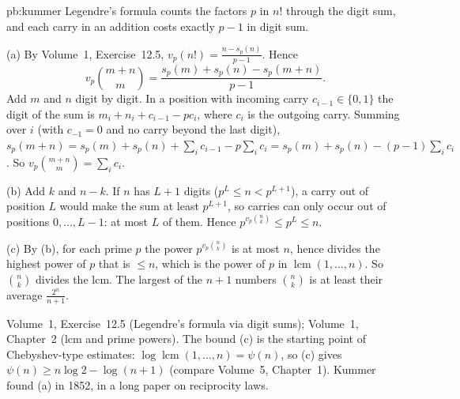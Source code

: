 \begin{solution}{pb:kummer}
\idea Legendre's formula counts the factors $p$ in $n!$ through the digit sum, and each carry in an addition costs exactly $p-1$
in digit sum.

\writeup (a) By Volume~1, Exercise~12.5, $v_p(n!)=\frac{n-s_p(n)}{p-1}$. Hence
\[
v_p\binom{m+n}m=\frac{s_p(m)+s_p(n)-s_p(m+n)}{p-1}.
\]
Add $m$ and $n$ digit by digit. In a position with incoming carry $c_{i-1}\in\{0,1\}$ the digit of the sum is
$m_i+n_i+c_{i-1}-pc_i$, where $c_i$ is the outgoing carry. Summing over $i$ (with $c_{-1}=0$ and no carry beyond the last digit),
$s_p(m+n)=s_p(m)+s_p(n)+\sum_ic_{i-1}-p\sum_ic_i=s_p(m)+s_p(n)-(p-1)\sum_ic_i$. So $v_p\binom{m+n}m=\sum_ic_i$.

(b) Add $k$ and $n-k$. If $n$ has $L+1$ digits ($p^L\le n<p^{L+1}$), a carry out of position $L$ would make the sum at least
$p^{L+1}$, so carries can only occur out of positions $0,\dots,L-1$: at most $L$ of them. Hence $p^{v_p\binom nk}\le p^L\le n$.

(c) By (b), for each prime $p$ the power $p^{v_p\binom nk}$ is at most $n$, hence divides the highest power of $p$ that is $\le n$,
which is the power of $p$ in $\operatorname{lcm}(1,\dots,n)$. So $\binom nk$ divides the lcm. The largest of the $n+1$ numbers
$\binom nk$ is at least their average $\frac{2^n}{n+1}$.

\tools Volume~1, Exercise~12.5 (Legendre's formula via digit sums); Volume~1, Chapter~2 (lcm and prime powers).
\leads The bound (c) is the starting point of Chebyshev-type estimates: $\log\operatorname{lcm}(1,\dots,n)=\psi(n)$, so (c) gives
$\psi(n)\ge n\log2-\log(n+1)$ (compare Volume~5, Chapter~1). Kummer found (a) in 1852, in a long paper on reciprocity laws.
\end{solution}

